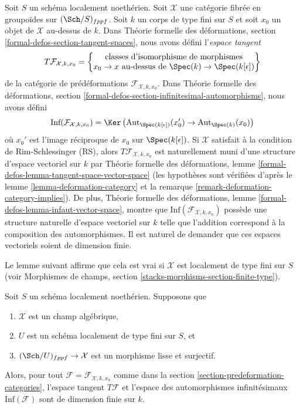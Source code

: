 \noindent
Soit $S$ un schéma localement noethérien. Soit $\mathcal{X}$ une catégorie
fibrée en groupoïdes sur $(\Sch/S)_{fppf}$. Soit $k$ un corps de type
fini sur $S$ et soit $x_0$ un objet de $\mathcal{X}$ au-dessus de $k$.
Dans Théorie formelle des déformations, section \ref{formal-defos-section-tangent-spaces},
nous avons défini l'{\it espace tangent}
\begin{equation}
\label{equation-tangent-space}
T\mathcal{F}_{\mathcal{X}, k, x_0} =
\left\{
\begin{matrix}
\text{classes d'isomorphisme de morphismes}\\
x_0 \to x\text{ au-dessus de }\Spec(k) \to \Spec(k[\epsilon])
\end{matrix}
\right\}
\end{equation}
de la catégorie de prédéformations $\mathcal{F}_{\mathcal{X}, k, x_0}$.
Dans Théorie formelle des déformations, section
\ref{formal-defos-section-infinitesimal-automorphisms},
nous avons défini
\begin{equation}
\label{equation-infinitesimal-automorphisms}
\text{Inf}(\mathcal{F}_{\mathcal{X}, k, x_0}) =
\Ker\left(
\text{Aut}_{\Spec(k[\epsilon])}(x'_0) \to \text{Aut}_{\Spec(k)}(x_0)
\right)
\end{equation}
où $x_0'$ est l'image réciproque de $x_0$ sur $\Spec(k[\epsilon])$.
Si $\mathcal{X}$ satisfait à la condition de Rim-Schlessinger (RS), alors
$T\mathcal{F}_{\mathcal{X}, k, x_0}$ est naturellement muni d'une
structure d'espace vectoriel sur $k$ par Théorie formelle des déformations, lemme
\ref{formal-defos-lemma-tangent-space-vector-space}
(les hypothèses sont vérifiées d'après le lemme \ref{lemma-deformation-category} et la
remarque \ref{remark-deformation-category-implies}). De plus,
Théorie formelle des déformations, lemme \ref{formal-defos-lemma-infaut-vector-space},
montre que $\text{Inf}(\mathcal{F}_{\mathcal{X}, k, x_0})$ possède une
structure naturelle d'espace vectoriel sur $k$ telle que l'addition correspond à la
composition des automorphismes. Il est naturel
de demander que ces espaces vectoriels soient de dimension finie.

\medskip\noindent
Le lemme suivant affirme que cela est vrai si
$\mathcal{X}$ est localement de type fini sur $S$ (voir
Morphismes de champs, section \ref{stacks-morphisms-section-finite-type}).

\begin{lemma}
\label{lemma-finite-dimension}
Soit $S$ un schéma localement noethérien. Supposons que
\begin{enumerate}
\item $\mathcal{X}$ est un champ algébrique,
\item $U$ est un schéma localement de type fini sur $S$, et
\item $(\Sch/U)_{fppf} \to \mathcal{X}$ est un morphisme lisse et
surjectif.
\end{enumerate}
Alors, pour tout $\mathcal{F} = \mathcal{F}_{\mathcal{X}, k, x_0}$ comme dans la
section \ref{section-predeformation-categories},
l'espace tangent $T\mathcal{F}$ et l'espace des automorphismes infinitésimaux
$\text{Inf}(\mathcal{F})$ sont de dimension finie sur $k$.
\end{lemma}

